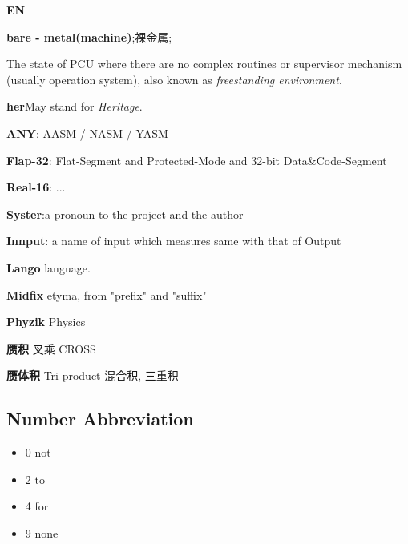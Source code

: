 \textbf{EN}

\textbf{bare - metal(machine)};裸金属; 

The state of PCU where there are no complex routines or supervisor mechanism (usually operation system), also known as \textit{freestanding environment}.

\textbf{her}May stand for \textit{Heritage}.

\textbf{ANY}: AASM / NASM / YASM

\textbf{Flap-32}: Flat-Segment and Protected-Mode and 32-bit Data\&Code-Segment

\textbf{Real-16}: ...

\textbf{Syster}:a pronoun to the project and the author

\textbf{Innput}: a name of input which measures same with that of Output

\textbf{Lango} language.

\textbf{Midfix} etyma, from "prefix" and "suffix"

\textbf{Phyzik} Physics

\textbf{赝积} 叉乘 CROSS

\textbf{赝体积} Tri-product 混合积, 三重积



\subsection{Number Abbreviation}

\begin{itemize}

\item 0 not

\item 2 to

\item 4 for

\item 9 none

\end{itemize}

